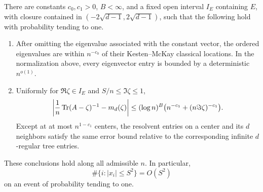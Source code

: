 \begin{proposition}\label{prop:spectral-input}
There are constants \(c_0,c_1>0\), \(B<\infty\), and a fixed open interval
\(I_E\) containing \(E\), with closure contained in
\((-2\sqrt{d-1},2\sqrt{d-1})\), such that the following hold with probability
tending to one.

\begin{enumerate}
\item After omitting the eigenvalue associated with the constant vector,
the ordered eigenvalues are within \(n^{-c_0}\) of their
Kesten--McKay classical locations. In the normalization above, every
eigenvector entry is bounded by a deterministic \(n^{o(1)}\).
\item Uniformly for \(\Re\zeta\in I_E\) and \(S/n\le\Im\zeta\le1\),
\[
 \left|\frac1n\operatorname{Tr}(A-\zeta)^{-1}-m_d(\zeta)\right|
 \le(\log n)^B\bigl(n^{-c_1}+(n\Im\zeta)^{-c_1}\bigr).
\]
Except at at most \(n^{1-c_1}\) centers, the resolvent entries on a
center and its \(d\) neighbors satisfy the same error bound relative
to the corresponding infinite \(d\)-regular tree entries.
\end{enumerate}
These conclusions hold along all admissible \(n\). In particular,
\[
 \#\{i:|x_i|\le S^2\}=O(S^2)
\]
on an event of probability tending to one.
\end{proposition}


